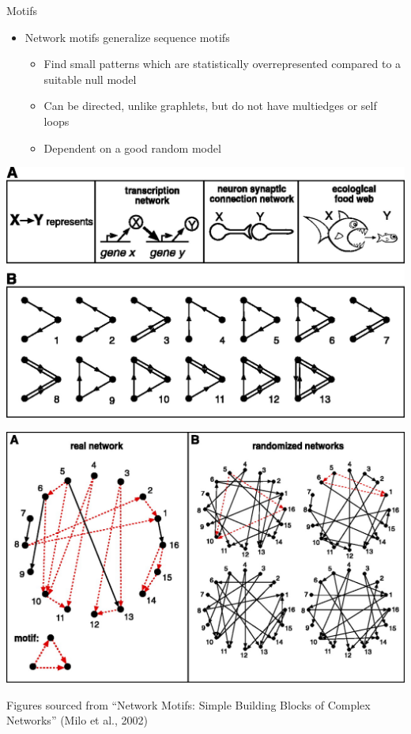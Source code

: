 \documentclass[xcolor=dvipsnames, 14pt]{beamer}
\begin{document}
\begin{frame}{Motifs}
\begin{itemize}
\item Network motifs generalize sequence motifs
\begin{itemize}
\item Find small patterns which are statistically overrepresented compared to a suitable null model
\item Can be directed, unlike graphlets, but do not have multiedges or self loops
\item Dependent on a good random model
\end{itemize}
\end{itemize}
\centering
\begin{minipage}{0.47\linewidth}
\includegraphics[width=\textwidth]{motif_demo_Milo_2002.png}
\end{minipage}\hfill
\begin{minipage}{0.47\linewidth}
\includegraphics[width=\textwidth]{motif_example_Milo_2002.png}
\end{minipage}
\tiny Figures sourced from ``Network Motifs: Simple Building Blocks of Complex Networks'' (Milo et al., 2002)
\end{frame}
\end{document}
